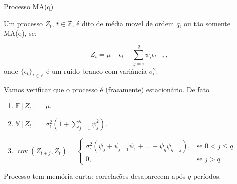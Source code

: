 \documentclass[11pt]{beamer}
\newenvironment{halfwideitemize}{\itemize\addtolength{\itemsep}{0.5em}}{\enditemize}
\begin{document}
\begin{frame}{Processo  MA(q)}
	\begin{halfwideitemize}
			\item Um processo $Z_t$, $t \in \mathbb{Z}$, é dito de média movel de ordem $q$, ou tão somente MA(q), se:
			
			$$Z_t = \mu + \epsilon_t + \sum_{j=i}^{q} \psi_i \epsilon_{t-i} \, ,$$
			onde $\{\epsilon_t\}_{t \in \mathbb{Z}}$ é um ruído branco com variância $\sigma^2_\epsilon$.
			\item Vamos verificar que o processo é (fracamente) estacionário. De fato
			\begin{enumerate}
				\item 			$\mathbb{E}[Z_t] = \mu $.
				\item $\mathbb{V}[Z_t] = \sigma^2_\epsilon(1+ \sum_{j=1}^q\psi^2_j)$.
				\item $\operatorname{cov}( Z_{t+j}, Z_t) = \begin{cases}
					\sigma^2_\epsilon (\psi_{j} + \psi_{j+1}\psi_1 + \ldots + \psi_q \psi_{q-j}), & \text{se } 0 < j  \leq q \\
					0,& \text{se } j  > q
				\end{cases}$
			\end{enumerate}
			\item Processo tem memória curta: correlações desaparecem após $q$ períodos.
	\end{halfwideitemize}
\end{frame}
\end{document}
